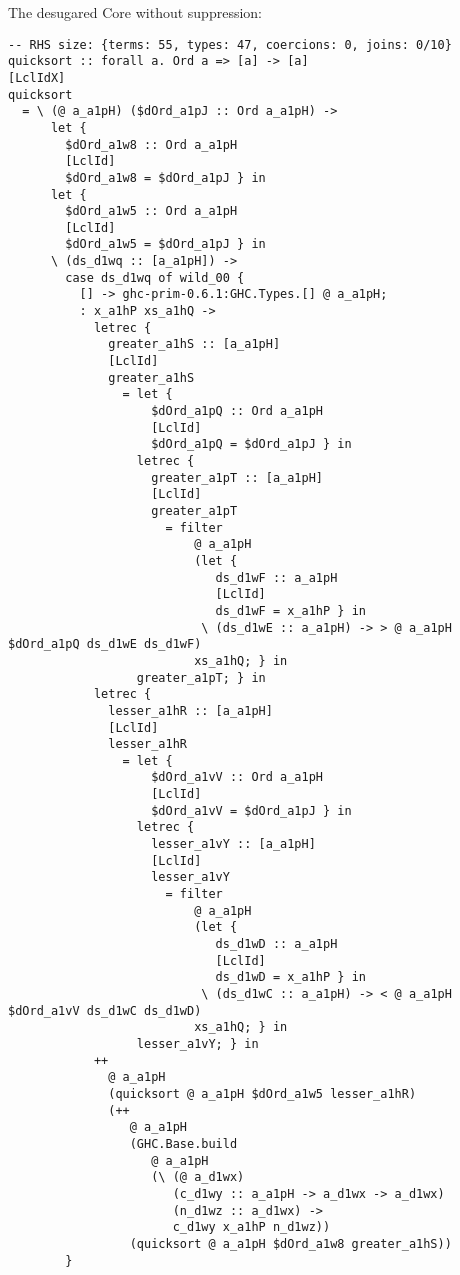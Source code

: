 The desugared Core without suppression:

\begin{listing}[H]
\begin{verbatim}
-- RHS size: {terms: 55, types: 47, coercions: 0, joins: 0/10}
quicksort :: forall a. Ord a => [a] -> [a]
[LclIdX]
quicksort
  = \ (@ a_a1pH) ($dOrd_a1pJ :: Ord a_a1pH) ->
      let {
        $dOrd_a1w8 :: Ord a_a1pH
        [LclId]
        $dOrd_a1w8 = $dOrd_a1pJ } in
      let {
        $dOrd_a1w5 :: Ord a_a1pH
        [LclId]
        $dOrd_a1w5 = $dOrd_a1pJ } in
      \ (ds_d1wq :: [a_a1pH]) ->
        case ds_d1wq of wild_00 {
          [] -> ghc-prim-0.6.1:GHC.Types.[] @ a_a1pH;
          : x_a1hP xs_a1hQ ->
            letrec {
              greater_a1hS :: [a_a1pH]
              [LclId]
              greater_a1hS
                = let {
                    $dOrd_a1pQ :: Ord a_a1pH
                    [LclId]
                    $dOrd_a1pQ = $dOrd_a1pJ } in
                  letrec {
                    greater_a1pT :: [a_a1pH]
                    [LclId]
                    greater_a1pT
                      = filter
                          @ a_a1pH
                          (let {
                             ds_d1wF :: a_a1pH
                             [LclId]
                             ds_d1wF = x_a1hP } in
                           \ (ds_d1wE :: a_a1pH) -> > @ a_a1pH $dOrd_a1pQ ds_d1wE ds_d1wF)
                          xs_a1hQ; } in
                  greater_a1pT; } in
            letrec {
              lesser_a1hR :: [a_a1pH]
              [LclId]
              lesser_a1hR
                = let {
                    $dOrd_a1vV :: Ord a_a1pH
                    [LclId]
                    $dOrd_a1vV = $dOrd_a1pJ } in
                  letrec {
                    lesser_a1vY :: [a_a1pH]
                    [LclId]
                    lesser_a1vY
                      = filter
                          @ a_a1pH
                          (let {
                             ds_d1wD :: a_a1pH
                             [LclId]
                             ds_d1wD = x_a1hP } in
                           \ (ds_d1wC :: a_a1pH) -> < @ a_a1pH $dOrd_a1vV ds_d1wC ds_d1wD)
                          xs_a1hQ; } in
                  lesser_a1vY; } in
            ++
              @ a_a1pH
              (quicksort @ a_a1pH $dOrd_a1w5 lesser_a1hR)
              (++
                 @ a_a1pH
                 (GHC.Base.build
                    @ a_a1pH
                    (\ (@ a_d1wx)
                       (c_d1wy :: a_a1pH -> a_d1wx -> a_d1wx)
                       (n_d1wz :: a_d1wx) ->
                       c_d1wy x_a1hP n_d1wz))
                 (quicksort @ a_a1pH $dOrd_a1w8 greater_a1hS))
        }
\end{verbatim}
\label{code:quicksort_core_raw}
\end{listing}

